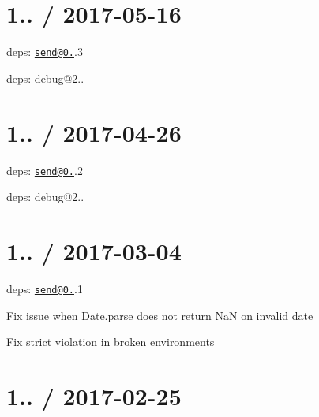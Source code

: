 \section*{1.. / 2017-\/05-\/16 }


\begin{DoxyItemize}
\item deps\+: \href{mailto:send@0.15}{\tt send@0.}.3
\begin{DoxyItemize}
\item deps\+: debug@2..
\end{DoxyItemize}
\end{DoxyItemize}

\section*{1.. / 2017-\/04-\/26 }


\begin{DoxyItemize}
\item deps\+: \href{mailto:send@0.15}{\tt send@0.}.2
\begin{DoxyItemize}
\item deps\+: debug@2..
\end{DoxyItemize}
\end{DoxyItemize}

\section*{1.. / 2017-\/03-\/04 }


\begin{DoxyItemize}
\item deps\+: \href{mailto:send@0.15}{\tt send@0.}.1
\begin{DoxyItemize}
\item Fix issue when {\ttfamily Date.\+parse} does not return {\ttfamily NaN} on invalid date
\item Fix strict violation in broken environments
\end{DoxyItemize}
\end{DoxyItemize}

\section*{1.. / 2017-\/02-\/25 }


